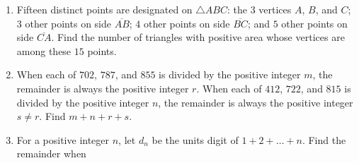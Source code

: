 \documentclass{article}
\begin{document}
\begin{enumerate}[label=\arabic*., itemsep=0.5em]
\item Fifteen distinct points are designated on \(\triangle ABC\): the 3 vertices \(A\), \(B\), and \(C\); \(3\) other points on side \(\overline{AB}\); \(4\) other points on side \(\overline{BC}\); and \(5\) other points on side \(\overline{CA}\). Find the number of triangles with positive area whose vertices are among these \(15\) points.\par \vspace{0.5em}\item When each of \(702\), \(787\), and \(855\) is divided by the positive integer \(m\), the remainder is always the positive integer \(r\). When each of \(412\), \(722\), and \(815\) is divided by the positive integer \(n\), the remainder is always the positive integer \(s \neq r\). Find \(m+n+r+s\).\par \vspace{0.5em}\item For a positive integer \(n\), let \(d_n\) be the units digit of \(1 + 2 + \dots + n\). Find the remainder when


\end{enumerate}
\end{document}
